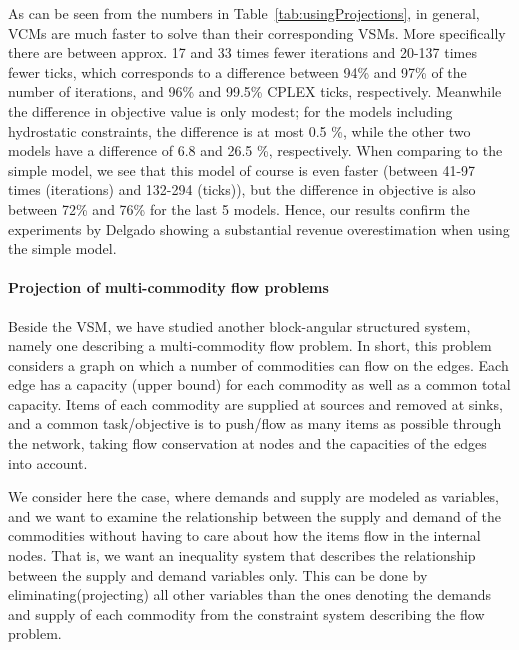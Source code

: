 \documentclass{llncs}
\begin{document}
As can be seen from the numbers in Table~\ref{tab:usingProjections}, in general, VCMs are much faster to solve than their corresponding VSMs. More specifically there are between approx. 17 and 33 times fewer iterations and 20-137 times fewer ticks, which corresponds to a difference between 94\% and 97\% of the number of iterations, and 96\% and 99.5\% CPLEX ticks, respectively. Meanwhile the difference in objective value is only modest; for the models including hydrostatic constraints, the difference is at most 0.5 \%, while the other two models have a difference of 6.8 and 26.5 \%, respectively. 
When comparing to the simple model, we see that this model of course is even faster (between 41-97 times (iterations) and 132-294 (ticks)), but the difference in objective is also between 72\% and 76\% for the last 5 models. Hence, our results confirm the experiments by Delgado \cite{AlbertosThesis} showing a substantial revenue overestimation when using the simple model. 

\paragraph{Projection of multi-commodity flow problems}
Beside the VSM, we have studied another block-angular structured system, namely one describing a multi-commodity flow problem.  
In short, this problem considers a graph on which a number of commodities can flow on the edges. Each edge has a capacity (upper bound) for each commodity as well as a common total capacity.
Items of each commodity are supplied at sources and removed at sinks, and a common task/objective is to push/flow as many items as possible through the network, taking flow conservation at nodes and the capacities of the edges into account.

We consider here the case, where demands and supply are modeled as variables, and we want to examine the relationship between the supply and demand of the commodities without having to care about how the items flow in the internal nodes. That is, we want an inequality system that describes the relationship between the supply and demand variables only. This can be done by eliminating(projecting) all other variables than the ones denoting the demands and supply of each commodity from the constraint system describing the flow problem. 
\end{document}
